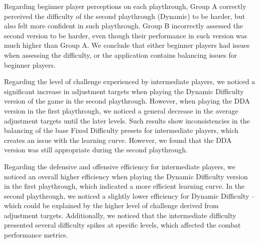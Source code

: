 Regarding beginner player perceptions on each playthrough, Group A correctly perceived the difficulty of the second playthrough (Dynamic) to be harder, but also felt more confident in such playthrough. Group B incorrectly assessed the second version to be harder, even though their performance in such version was much higher than Group A. We conclude that either beginner players had issues when assessing the difficulty, or the application contains balancing issues for beginner players.



Regarding the level of challenge experienced by intermediate players, we noticed a significant increase in adjustment targets when playing the Dynamic Difficulty version of the game in the second playthrough. However, when playing the DDA version in the first playthrough, we noticed a general decrease in the average adjustment targets until the later levels. Such results show inconsistencies in the balancing of the base Fixed Difficulty presets for intermediate players, which creates an issue with the learning curve. However, we found that the DDA version was still appropriate during the second playthrough.

Regarding the defensive and offensive efficiency for intermediate players, we noticed an overall higher efficiency when playing the Dynamic Difficulty version in the first playthrough, which indicated a more efficient learning curve. In the second playthrough, we noticed a slightly lower efficiency for Dynamic Difficulty -- which could be explained by the higher level of challenge derived from adjustment targets. Additionally, we noticed that the intermediate difficulty presented several difficulty spikes at specific levels, which affected the combat performance metrics.

